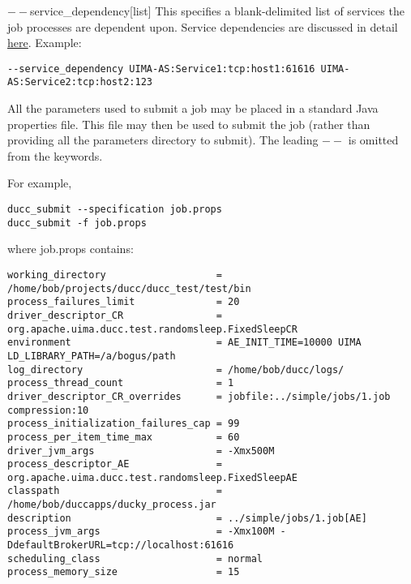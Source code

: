 \begin{description}
           \begin{sloppypar}             
           \item[$--$service\_dependency{[list]}] This specifies a blank-delimited list of services the job
             processes are dependent upon. Service dependencies are discussed in detail
             \hyperref[sec:service.endpoints]{here}. Example:
\begin{verbatim}
--service_dependency UIMA-AS:Service1:tcp:host1:61616 UIMA-AS:Service2:tcp:host2:123 
\end{verbatim}
           \end{sloppypar}
           
           \item[$--$specification, $-$f {[file]}  ]

             All the parameters used to submit a job may be placed in a standard Java properties file. 
             This file may then be used to submit the job (rather than providing all the parameters 
             directory to submit). The leading $--$ is omitted from the keywords.

             For example, 
\begin{verbatim}
ducc_submit --specification job.props 
ducc_submit -f job.props 
\end{verbatim}

             where job.props contains: 
\begin{verbatim}
working_directory                   = /home/bob/projects/ducc/ducc_test/test/bin 
process_failures_limit              = 20 
driver_descriptor_CR                = org.apache.uima.ducc.test.randomsleep.FixedSleepCR 
environment                         = AE_INIT_TIME=10000 UIMA LD_LIBRARY_PATH=/a/bogus/path
log_directory                       = /home/bob/ducc/logs/ 
process_thread_count                = 1 
driver_descriptor_CR_overrides      = jobfile:../simple/jobs/1.job compression:10 
process_initialization_failures_cap = 99 
process_per_item_time_max           = 60 
driver_jvm_args                     = -Xmx500M 
process_descriptor_AE               = org.apache.uima.ducc.test.randomsleep.FixedSleepAE 
classpath                           = /home/bob/duccapps/ducky_process.jar 
description                         = ../simple/jobs/1.job[AE] 
process_jvm_args                    = -Xmx100M -DdefaultBrokerURL=tcp://localhost:61616 
scheduling_class                    = normal 
process_memory_size                 = 15 
\end{verbatim}


\end{description}
